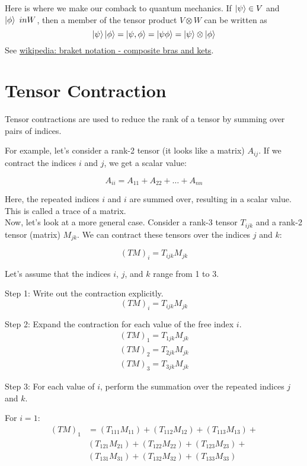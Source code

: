 Here is where we make our comback to quantum mechanics.
If $\ket{\psi} \in V$ and $\ket{\phi} \ in W$, then a member of the tensor product $V \otimes W$ can be written
as
$$
\ket{\psi}\ket{\phi} = \ket{\psi, \phi} = \ket{\psi\phi} = \ket{\psi} \otimes \ket{\phi}
$$
See
\href{https://en.wikipedia.org/wiki/Bra%E2%80%93ket_notation}{wikipedia: braket notation - composite bras and kets}.


\section{Tensor Contraction}


Tensor contractions are used to reduce the rank of a tensor by summing over pairs of indices.

For example, let's consider a rank-2 tensor (it looks like a matrix) $A_{ij}$.
If we contract the indices $i$ and $j$, we get a scalar value:

$$
A_{ii} = A_{11} + A_{22} + \dots + A_{nn}
$$

Here, the repeated indices $i$ and $i$ are summed over, resulting in a scalar value.
This is called a trace of a matrix.
\\

Now, let's look at a more general case.
Consider a rank-3 tensor $T_{ijk}$ and a rank-2 tensor (matrix) $M_{jk}$.
We can contract these tensors over the indices $j$ and $k$:

$$
(TM)_i = T_{ijk} M_{jk}
$$

Let's assume that the indices $i$, $j$, and $k$ range from 1 to 3.

Step 1: Write out the contraction explicitly.
$$
(TM)_i = T_{ijk} M_{jk}
$$

Step 2: Expand the contraction for each value of the free index $i$.
\begin{align*}
(TM)_1 = T_{1jk} M_{jk} \\
(TM)_2 = T_{2jk} M_{jk} \\
(TM)_3 = T_{3jk} M_{jk}
\end{align*}

Step 3: For each value of $i$, perform the summation over the repeated indices $j$ and $k$.

For $i = 1$:
\begin{align*}
(TM)_1 &= (T_{111} M_{11}) + (T_{112} M_{12}) + (T_{113} M_{13}) + \\
        & (T_{121} M_{21}) + (T_{122} M_{22}) + (T_{123} M_{23}) + \\
        & (T_{131} M_{31}) + (T_{132} M_{32}) + (T_{133} M_{33})
\end{align*}


